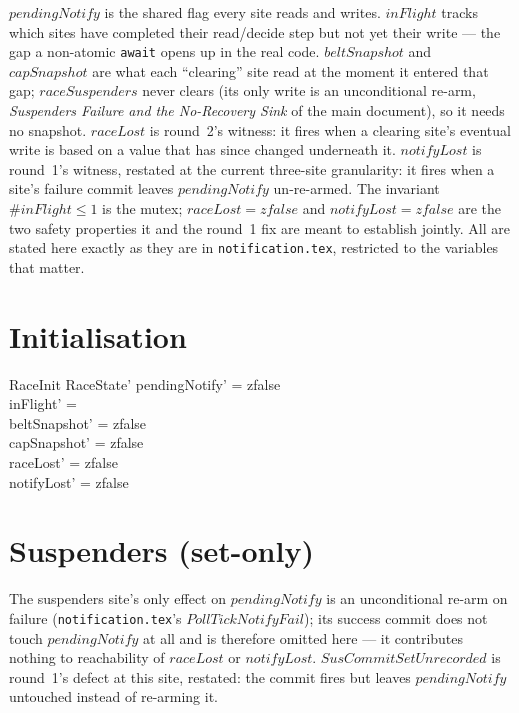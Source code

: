 \documentclass[a4paper,10pt,fleqn]{article}
\begin{document}
$pendingNotify$ is the shared flag every site reads and writes.
$inFlight$ tracks which sites have completed their read/decide step but
not yet their write --- the gap a non-atomic \texttt{await} opens up in
the real code.  $beltSnapshot$ and $capSnapshot$ are what each
``clearing'' site read at the moment it entered that gap;
$raceSuspenders$ never clears (its only write is an unconditional
re-arm, \emph{Suspenders Failure and the No-Recovery Sink} of the main document), so it needs
no snapshot.  $raceLost$ is round~2's witness: it fires when a clearing
site's eventual write is based on a value that has since changed
underneath it.  $notifyLost$ is round~1's witness, restated at the
current three-site granularity: it fires when a site's failure commit
leaves $pendingNotify$ un-re-armed.  The invariant $\# inFlight \leq 1$
is the mutex; $raceLost = zfalse$ and $notifyLost = zfalse$ are the two
safety properties it and the round~1 fix are meant to establish jointly.
All are stated here exactly as they are in \texttt{notification.tex},
restricted to the variables that matter.

\section{Initialisation}

\begin{schema}{RaceInit}
  RaceState'
  \where
  pendingNotify' = zfalse \\
  inFlight' = \emptyset \\
  beltSnapshot' = zfalse \\
  capSnapshot' = zfalse \\
  raceLost' = zfalse \\
  notifyLost' = zfalse
\end{schema}

\section{Suspenders (set-only)}

The suspenders site's only effect on $pendingNotify$ is an unconditional
re-arm on failure (\texttt{notification.tex}'s $PollTickNotifyFail$); its
success commit does not touch $pendingNotify$ at all and is therefore
omitted here --- it contributes nothing to reachability of $raceLost$ or
$notifyLost$.  $SusCommitSetUnrecorded$ is round~1's defect at this
site, restated: the commit fires but leaves $pendingNotify$ untouched
instead of re-arming it.
\end{document}
